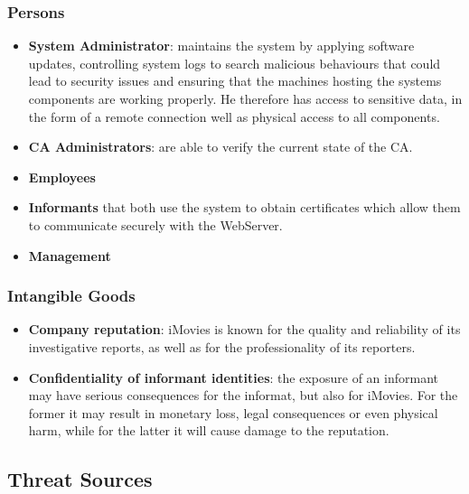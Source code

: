 \documentclass[english]{article}
\begin{document}
\subsubsection{\textbf{Persons}}
\begin{itemize}
\item \textbf{System Administrator}: maintains the system by applying software updates, controlling system logs to search malicious behaviours that could lead to security issues and ensuring that the machines hosting the systems components are working properly. He therefore has access to sensitive data, in the form of a remote connection well as physical access to all components.
\item \textbf{CA Administrators}: are able to verify the current state of the CA.
\item \textbf{Employees}
\item \textbf{Informants} that both use the system to obtain certificates which allow them to communicate securely with the WebServer.
\item \textbf{Management}
\end{itemize}

\subsubsection{\textbf{Intangible Goods}}
\begin{itemize}
\item \textbf{Company reputation}: iMovies is known for the quality and reliability of its investigative reports, as well as for the professionality of its reporters.
\item \textbf{Confidentiality of informant identities}: the exposure of an informant may have serious consequences for the informat, but also for iMovies. For the former it may result in monetary loss, legal consequences or even physical harm, while for the latter it will cause damage to the reputation.
\end{itemize}

\subsection{Threat Sources}

\end{document}
